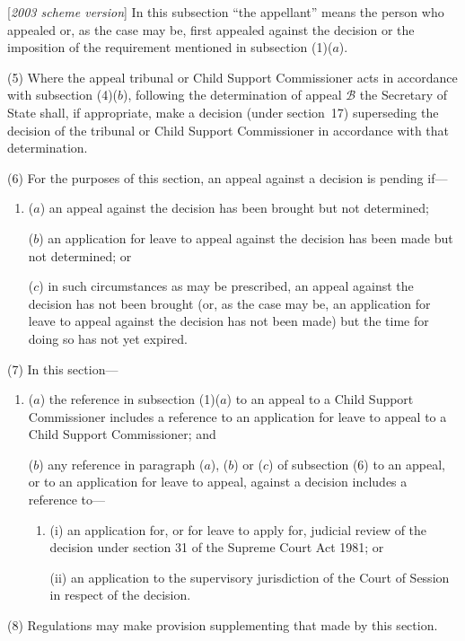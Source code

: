 \documentclass[12pt,a4paper]{article}
\begin{document}
[\emph{2003 scheme version}] In this subsection “the appellant” means the person who appealed or, as the case may be, first appealed against the decision 
or the imposition of the requirement  %
mentioned in subsection (1)($a$).

(5) Where the appeal tribunal or Child Support Commissioner acts in accordance with subsection (4)($b$), following the determination of appeal $\mathcal{B}$ the Secretary of State shall, if appropriate, make a decision (under section~17) superseding the decision of the tribunal or Child Support Commissioner in accordance with that determination.

(6) For the purposes of this section, an appeal against a decision is pending if—
\begin{enumerate}\item[]
($a$) an appeal against the decision has been brought but not determined;

($b$) an application for leave to appeal against the decision has been made but not determined; or

($c$) in such circumstances as may be prescribed, an appeal against the decision has not been brought (or, as the case may be, an application for leave to appeal against the decision has not been made) but the time for doing so has not yet expired.
\end{enumerate}

(7) In this section—
\begin{enumerate}\item[]
($a$) the reference in subsection (1)($a$) to an appeal to a Child Support Commissioner includes a reference to an application for leave to appeal to a Child Support Commissioner; and

($b$) any reference in paragraph ($a$), ($b$) or ($c$) of subsection (6) to an appeal, or to an application for leave to appeal, against a decision includes a reference to—
\begin{enumerate}\item[]
(i) an application for, or for leave to apply for, judicial review of the decision under section 31 of the Supreme Court Act 1981; or

(ii) an application to the supervisory jurisdiction of the Court of Session in respect of the decision.
\end{enumerate}
\end{enumerate}

(8) Regulations may make provision supplementing that made by this section.
\end{document}
